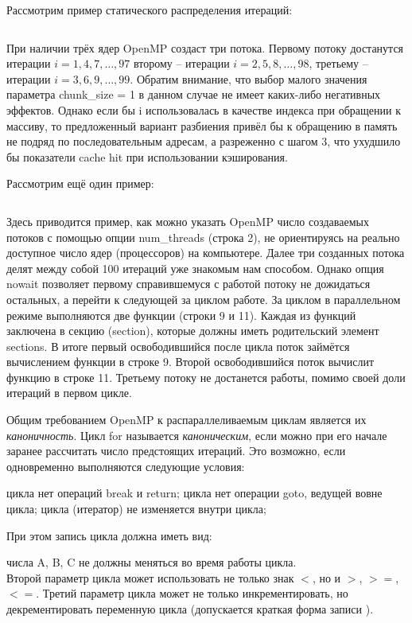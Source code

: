 Рассмотрим пример статического распределения итераций:

\inputminted{c++}{listings/OpenMPExample13.cpp}

При наличии трёх ядер OpenMP создаст три потока. Первому потоку достанутся итерации\; $i=1, 4, 7, \dots, 97$ второму -- итерации\; $i=2, 5, 8, \dots, 98$, третьему -- итерации\; $i=3, 6, 9, \dots, 99$. Обратим внимание, что выбор малого значения параметра chunk\_size = 1 в данном случае не имеет каких-либо негативных эффектов. Однако если бы i использовалась в качестве индекса при обращении к массиву, то предложенный вариант разбиения привёл бы к обращению в память не подряд по последовательным адресам, а разреженно с шагом 3, что ухудшило бы показатели cache hit при использовании кэширования.

Рассмотрим ещё один пример: 

\inputminted{c++}{listings/OpenMPExample14.cpp}

Здесь приводится пример, как можно указать OpenMP число создаваемых потоков с помощью опции num\_threads (строка 2), не ориентируясь на реально доступное число ядер (процессоров) на компьютере. Далее три созданных потока делят между собой 100 итераций уже знакомым нам способом. Однако опция nowait позволяет первому справившемуся с работой потоку не дожидаться остальных, а перейти к следующей за циклом работе. За циклом в параллельном режиме выполняются две функции (строки 9 и 11). Каждая из функций заключена в секцию (section), которые должны иметь родительский элемент sections. В итоге первый освободившийся после цикла поток займётся вычислением функции в строке 9. Второй освободившийся поток вычислит функцию в строке 11. Третьему потоку не достанется работы, помимо своей доли итераций в первом цикле.

Общим требованием OpenMP к распараллеливаемым циклам является их \textit{каноничность}. Цикл for называется \textit{каноническим}, если можно при его начале заранее рассчитать число предстоящих итераций. Это возможно, если одновременно выполняются следующие условия:

\begin{itemize}
     цикла нет операций break и return;
     цикла нет операции goto, ведущей вовне цикла;
     цикла (итератор) не изменяется внутри цикла;
\end{itemize}

При этом запись цикла должна иметь вид: 

 числа A, B, C не должны меняться во время работы цикла. \\
Второй параметр цикла может использовать не только знак $<$, но и $>$, $>=$, $<=$. Третий параметр цикла может не только инкрементировать, но декрементировать переменную цикла (допускается краткая форма записи ).


